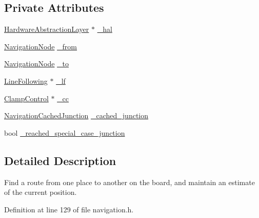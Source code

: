 \subsection*{Private Attributes}
\begin{DoxyCompactItemize}
\item 
\hyperlink{classIDP_1_1HardwareAbstractionLayer}{HardwareAbstractionLayer} $\ast$ \hyperlink{classIDP_1_1Navigation_a640c36341bdf1e2d4ef194ad3aac9773}{\_\-hal}
\item 
\hyperlink{namespaceIDP_a286f26dda01010063dff761803b4cd16}{NavigationNode} \hyperlink{classIDP_1_1Navigation_a7ce2cbd9199af73b36d4e887282a38e6}{\_\-from}
\item 
\hyperlink{namespaceIDP_a286f26dda01010063dff761803b4cd16}{NavigationNode} \hyperlink{classIDP_1_1Navigation_a76df45b8316e55560e1adc9165700d0f}{\_\-to}
\item 
\hyperlink{classIDP_1_1LineFollowing}{LineFollowing} $\ast$ \hyperlink{classIDP_1_1Navigation_a61d775069513302fa6b23c64da7a6ec4}{\_\-lf}
\item 
\hyperlink{classIDP_1_1ClampControl}{ClampControl} $\ast$ \hyperlink{classIDP_1_1Navigation_a49b7088c125ef5c7a5227e2242b84947}{\_\-cc}
\item 
\hyperlink{namespaceIDP_a628dde0214c4c861deda405e77ad75a2}{NavigationCachedJunction} \hyperlink{classIDP_1_1Navigation_a5d511a56a6f3bdcfde2619ae4d75dcaa}{\_\-cached\_\-junction}
\item 
bool \hyperlink{classIDP_1_1Navigation_afedddd1408af4893658b8f49d4200af8}{\_\-reached\_\-special\_\-case\_\-junction}
\end{DoxyCompactItemize}


\subsection{Detailed Description}
Find a route from one place to another on the board, and maintain an estimate of the current position. 

Definition at line 129 of file navigation.h.



